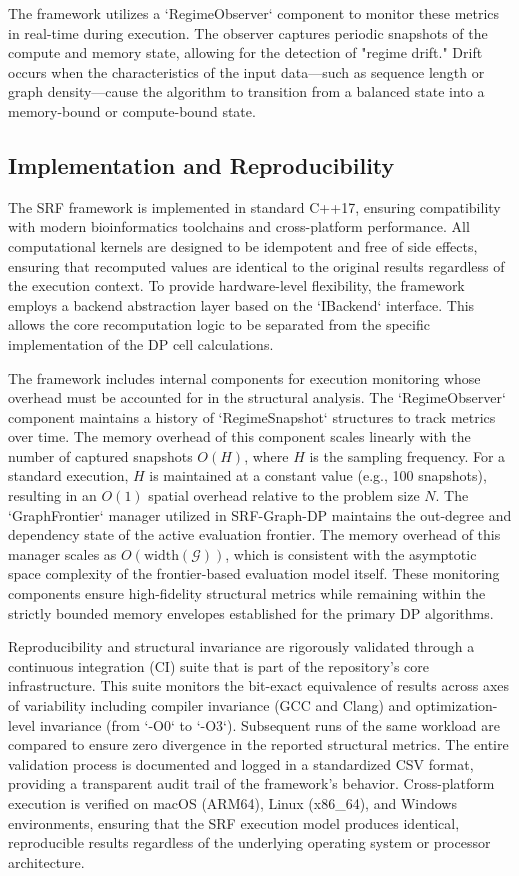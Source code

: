 The framework utilizes a `RegimeObserver` component to monitor these metrics in real-time during execution. The observer captures periodic snapshots of the compute and memory state, allowing for the detection of "regime drift." Drift occurs when the characteristics of the input data---such as sequence length or graph density---cause the algorithm to transition from a balanced state into a memory-bound or compute-bound state.

\subsection{Implementation and Reproducibility}

The SRF framework is implemented in standard C++17, ensuring compatibility with modern bioinformatics toolchains and cross-platform performance. All computational kernels are designed to be idempotent and free of side effects, ensuring that recomputed values are identical to the original results regardless of the execution context. To provide hardware-level flexibility, the framework employs a backend abstraction layer based on the `IBackend` interface. This allows the core recomputation logic to be separated from the specific implementation of the DP cell calculations.

The framework includes internal components for execution monitoring whose overhead must be accounted for in the structural analysis. The `RegimeObserver` component maintains a history of `RegimeSnapshot` structures to track metrics over time. The memory overhead of this component scales linearly with the number of captured snapshots $O(H)$, where $H$ is the sampling frequency. For a standard execution, $H$ is maintained at a constant value (e.g., 100 snapshots), resulting in an $O(1)$ spatial overhead relative to the problem size $N$. The `GraphFrontier` manager utilized in SRF-Graph-DP maintains the out-degree and dependency state of the active evaluation frontier. The memory overhead of this manager scales as $O(\text{width}(\mathcal{G}))$, which is consistent with the asymptotic space complexity of the frontier-based evaluation model itself. These monitoring components ensure high-fidelity structural metrics while remaining within the strictly bounded memory envelopes established for the primary DP algorithms.

Reproducibility and structural invariance are rigorously validated through a continuous integration (CI) suite that is part of the repository's core infrastructure. This suite monitors the bit-exact equivalence of results across axes of variability including compiler invariance (GCC and Clang) and optimization-level invariance (from `-O0` to `-O3`). Subsequent runs of the same workload are compared to ensure zero divergence in the reported structural metrics. The entire validation process is documented and logged in a standardized CSV format, providing a transparent audit trail of the framework's behavior. Cross-platform execution is verified on macOS (ARM64), Linux (x86\_64), and Windows environments, ensuring that the SRF execution model produces identical, reproducible results regardless of the underlying operating system or processor architecture.
